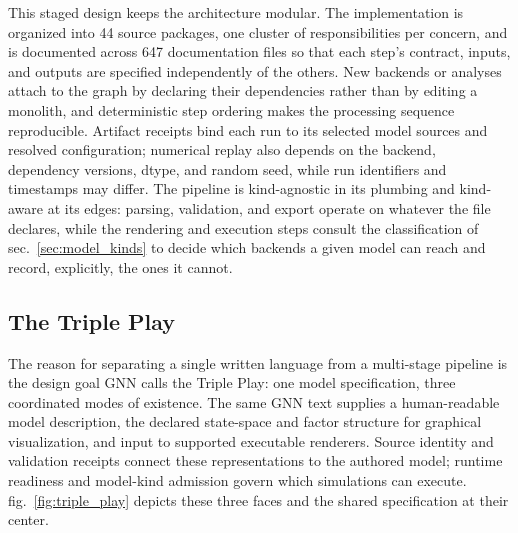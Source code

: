 \documentclass[
  english,
  9pt,
]{extarticle}
\begin{document}
This staged design keeps the architecture modular. The implementation is
organized into 44 source packages, one cluster of responsibilities per
concern, and is documented across 647 documentation files so that each
step's contract, inputs, and outputs are specified independently of the
others. New backends or analyses attach to the graph by declaring their
dependencies rather than by editing a monolith, and deterministic step
ordering makes the processing sequence reproducible. Artifact receipts
bind each run to its selected model sources and resolved configuration;
numerical replay also depends on the backend, dependency versions,
dtype, and random seed, while run identifiers and timestamps may differ.
The pipeline is kind-agnostic in its plumbing and kind-aware at its
edges: parsing, validation, and export operate on whatever the file
declares, while the rendering and execution steps consult the
classification of sec.~\ref{sec:model_kinds} to decide which backends a
given model can reach and record, explicitly, the ones it cannot.

\subsection{The Triple Play}\label{the-triple-play}

The reason for separating a single written language from a multi-stage
pipeline is the design goal GNN calls the Triple Play: one model
specification, three coordinated modes of existence. The same GNN text
supplies a human-readable model description, the declared state-space
and factor structure for graphical visualization, and input to supported
executable renderers. Source identity and validation receipts connect
these representations to the authored model; runtime readiness and
model-kind admission govern which simulations can execute.
fig.~\ref{fig:triple_play} depicts these three faces and the shared
specification at their center.
\end{document}
